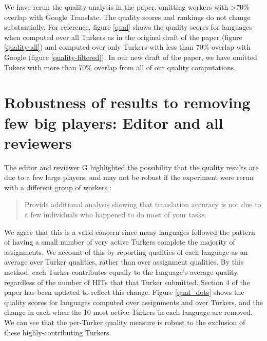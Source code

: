 \documentclass[11pt]{article}
\begin{document}
We have rerun the quality analysis in the paper, omitting workers with \textgreater 70\% overlap with Google Translate. The quality scores and rankings do not change substantially. For reference, figure \ref{qual} shows the quality scores for languages when computed over all Turkers as in the original draft of the paper (figure \ref{quality-all}) and computed over only Turkers with less than 70\% overlap with Google (figure \ref{quality-filtered}). In our new draft of the paper, we have omitted Tukers with more than 70\% overlap from all of our quality computations.




\section{Robustness of results to removing few big players: Editor and all reviewers}

The editor and reviewer G highlighted the possibility that the quality results are due to a few large players, and may not be robust if the experiment were rerun with a different group of workers : 
\begin{quote}
Provide additional analysis showing that translation accuracy is not due to a few individuals who happened to do most of your tasks.
\end{quote}

We agree that this is a valid concern since many languages followed the pattern of having a small number of very active Turkers complete the majority of assignments. We account of this by reporting qualities of each language as an average over Turker qualities, rather than over assignment qualities. By this method, each Turker contributes equally to the language's average quality, regardless of the number of HITs that that Turker submitted. Section 4 of the paper has been updated to reflect this change. Figure \ref{qual_dots} shows the quality scores for languages computed over assignments and over Turkers, and the change in each when the 10 most active Turkers in each language are removed. We can see that the per-Turker quality measure is robust to the exclusion of these highly-contributing Turkers. 
\end{document}
